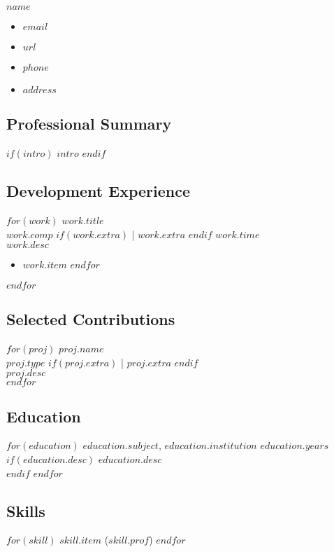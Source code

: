\documentclass[$fontsize$, letter]{article}
\newcommand{\heading}[1]{
    \hrulefill \vspace{-0.5cm} \subsection*{{\color{gray} #1}}
}
\begin{document}
\begin{minipage}[t]{0.4\textwidth}
    {\Huge $name$}\\[.2cm]
\end{minipage}
\hfill
\begin{minipage}[b][2cm][b]{0.4\textwidth}
    \begin{itemize}[label={}, align=right]
        \item \hfill $email$
        \item \hfill \href{https://$url$}{$url$}
        \item \hfill $phone$
        \item \hfill $address$
    \end{itemize}
\end{minipage}

\heading{Professional Summary}
$if(intro)$
    \textsc{$intro$}
$endif$

\heading{Development Experience}
$for(work)$
    {\large $work.title$}\\
    {\color{gray}
    $work.comp$
    $if(work.extra)$ \big| $work.extra$ $endif$
    \hspace*{\fill} $work.time$}
    \\
    $work.desc$\\
    \vspace{-\baselineskip}
    \begin{itemize}
    $for(work.item)$
        \item $work.item$
    $endfor$
    \end{itemize}
$endfor$
    
\heading{Selected Contributions}
$for(proj)$
{\large $proj.name$}\\
{\color{gray} $proj.type$ $if(proj.extra)$ \big| $proj.extra$ $endif$} \\
$proj.desc$ \vspace{\topsep} \\
$endfor$

\heading{Education}
$for(education)$
    $education.subject$, $education.institution$
    \hspace*{\fill} {\color{gray} $education.years$}\\
    $if(education.desc)$ $education.desc$\\ $endif$
    \vspace{-\baselineskip}
$endfor$

\heading{Skills}
$for(skill)$
    {$skill.item$ ($skill.prof$)}
$endfor$
\end{document}
